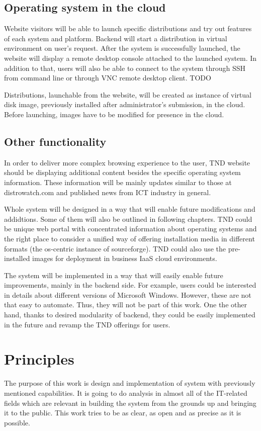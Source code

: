 \documentclass[thesis=B,english]{FITthesis}[2013/04/26]
\begin{document}
\subsection{Operating system in the cloud}

Website visitors will be able to launch specific distributions and try out features of each system and platform. Backend will start a distribution in virtual environment on user's request. After the system is successfully launched, the website will display a remote desktop console attached to the launched system. In addition to that, users will also be able to connect to the system through SSH from command line or through VNC remote desktop client. TODO

Distributions, launchable from the website, will be created as instance of virtual disk image, previously installed after administrator's submission, in the cloud. Before launching, images have to be modified for presence in the cloud.

\subsection{Other functionality}
\label{section:other_functionality}
In order to deliver more complex browsing experience to the user, TND website should be displaying additional content besides the specific operating system information. These information will be mainly updates similar to those at distrowatch.com and published news from ICT industry in general.

Whole system will be designed in a way that will enable future modifications and addidtions. Some of them will also be outlined in following chapters. TND could be unique web portal with concentrated information about operating systems and the right place to consider a unified way of offering installation media in different formats (the os-centric instance of sourceforge). TND could also use the pre-installed images for deployment in business IaaS cloud environments.

The system will be implemented in a way that will easily enable future improvements, mainly in the backend side. For example, users could be interested in details about different versions of Microsoft Windows. However, these are not that easy to automate. Thus, they will not be part of this work. One the other hand, thanks to desired modularity of backend, they could be easily implemented in the future and revamp the TND offerings for users.

\section{Principles}
\label{section:principles}
The purpose of this work is design and implementation of system with previously mentioned capabilities. It is going to do analysis in almost all of the IT-related fields which are relevant in building the system from the grounds up and bringing it to the public. This work tries to be as clear, as open and as precise as it is possible.
\end{document}
